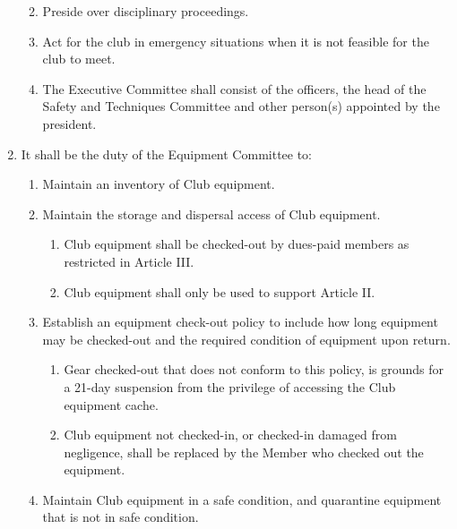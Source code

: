 \documentclass[
]{article}
\providecommand{\tightlist}{%
  \setlength{\itemsep}{0pt}\setlength{\parskip}{0pt}}
\begin{document}
\begin{enumerate}
  \begin{enumerate}
  \def\labelenumii{\Alph{enumii}.}
  \tightlist
  \item
    Preside over disciplinary proceedings.
  \item
    Act for the club in emergency situations when it is not feasible for
    the club to meet.
  \item
    The Executive Committee shall consist of the officers, the head of
    the Safety and Techniques Committee and other person(s) appointed by
    the president.
  \end{enumerate}
\item
  It shall be the duty of the Equipment Committee to:

  \begin{enumerate}
  \def\labelenumii{\Alph{enumii}.}
  \tightlist
  \item
    Maintain an inventory of Club equipment.
  \item
    Maintain the storage and dispersal access of Club equipment.

    \begin{enumerate}
    \def\labelenumiii{\roman{enumiii}.}
    \tightlist
    \item
      Club equipment shall be checked-out by dues-paid members as
      restricted in Article III.
    \item
      Club equipment shall only be used to support Article II.
    \end{enumerate}
  \item
    Establish an equipment check-out policy to include how long
    equipment may be checked-out and the required condition of equipment
    upon return.

    \begin{enumerate}
    \def\labelenumiii{\roman{enumiii}.}
    \tightlist
    \item
      Gear checked-out that does not conform to this policy, is grounds
      for a 21-day suspension from the privilege of accessing the Club
      equipment cache.
    \item
      Club equipment not checked-in, or checked-in damaged from
      negligence, shall be replaced by the Member who checked out the
      equipment.
    \end{enumerate}
  \item
    Maintain Club equipment in a safe condition, and quarantine
    equipment that is not in safe condition.


\end{enumerate}
\end{enumerate}
\end{document}
